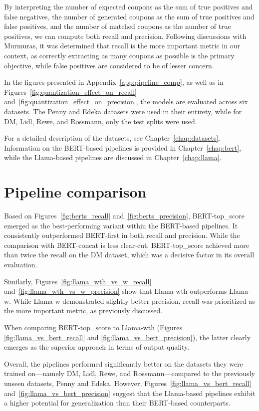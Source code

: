 \documentclass[licencjacka,en]{pracamgr}
\begin{document}
By interpreting the number of expected coupons as the sum of true positives and false negatives, the number of generated coupons as the sum of true positives and false positives, and the number of matched coupons as the number of true positives, we can compute both recall and precision. Following discussions with Murmuras, it was determined that recall is the more important metric in our context, as correctly extracting as many coupons as possible is the primary objective, while false positives are considered to be of lesser concern.

In the figures presented in Appendix~\ref{app:pipeline_comp}, as well as in Figures~\ref{fig:quantization_effect_on_recall} and~\ref{fig:quantization_effect_on_precision}, the models are evaluated across six datasets. The Penny and Edeka datasets were used in their entirety, while for DM, Lidl, Rewe, and Rossmann, only the test splits were used.

For a detailed description of the datasets, see Chapter~\ref{chap:datasets}. Information on the BERT-based pipelines is provided in Chapter~\ref{chap:bert}, while the Llama-based pipelines are discussed in Chapter~\ref{chap:llama}.

\section{Pipeline comparison}

Based on Figures~\ref{fig:berts_recall} and~\ref{fig:berts_precision}, BERT-top\_score emerged as the best-performing variant within the BERT-based pipelines. It consistently outperformed BERT-first in both recall and precision. While the comparison with BERT-concat is less clear-cut, BERT-top\_score achieved more than twice the recall on the DM dataset, which was a decisive factor in its overall evaluation.

Similarly, Figures~\ref{fig:llama_wth_vs_w_recall} and~\ref{fig:llama_wth_vs_w_precision} show that Llama-wth outperforms Llama-w. While Llama-w demonstrated slightly better precision, recall was prioritized as the more important metric, as previously discussed.

When comparing BERT-top\_score to Llama-wth (Figures \ref{fig:llama_vs_bert_recall} and \ref{fig:llama_vs_bert_precision}), the latter clearly emerges as the superior approach in terms of output quality.

Overall, the pipelines performed significantly better on the datasets they were trained on—namely DM, Lidl, Rewe, and Rossmann—compared to the previously unseen datasets, Penny and Edeka. However, Figures~\ref{fig:llama_vs_bert_recall} and~\ref{fig:llama_vs_bert_precision} suggest that the Llama-based pipelines exhibit a higher potential for generalization than their BERT-based counterparts.
\end{document}
